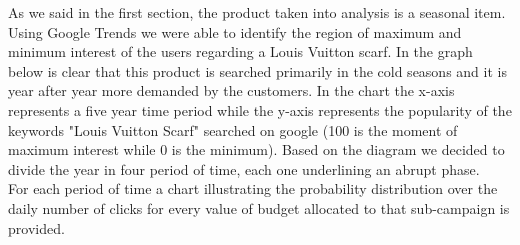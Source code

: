 As we said in the first section, the product taken into analysis is a seasonal item. Using Google Trends we were able to identify the region of maximum and minimum interest of the users regarding a Louis Vuitton scarf. In the graph below is clear that this product is searched primarily in the cold seasons and it is year after year more demanded by the customers. In the chart the x-axis represents a five year time period while the y-axis represents the popularity of the keywords "Louis Vuitton Scarf" searched on google (100 is the moment of maximum interest while 0 is the minimum).
Based on the diagram we decided to divide the year in four period of time, each one underlining an abrupt phase.\newline\\
For each period of time a chart illustrating the probability distribution over the daily number of clicks for every value of budget allocated to that sub-campaign is provided.\newline
{} 
